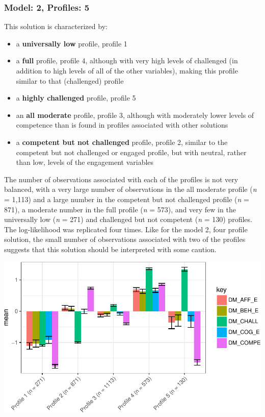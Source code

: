 \documentclass[]{msu-thesis}
\providecommand{\tightlist}{%
  \setlength{\itemsep}{0pt}\setlength{\parskip}{0pt}}
\theoremstyle{definition}
\theoremstyle{definition}
\theoremstyle{definition}
\theoremstyle{remark}
\begin{document}
\subsubsection{Model: 2, Profiles: 5}\label{model-2-profiles-5}

This solution is characterized by:

\begin{itemize}
\tightlist
\item
  a \textbf{universally low} profile, profile 1
\item
  a \textbf{full} profile, profile 4, although with very high levels of
  challenged (in addition to high levels of all of the other variables),
  making this profile similar to that (challenged) profile
\item
  a \textbf{highly challenged} profile, profile 5
\item
  an \textbf{all moderate} profile, profile 3, although with moderately
  lower levels of competence than is found in profiles associated with
  other solutions
\item
  a \textbf{competent but not challenged} profile, profile 2, similar to
  the competent but not challenged or engaged profile, but with neutral,
  rather than low, levels of the engagement variables
\end{itemize}

The number of observations associated with each of the profiles is not
very balanced, with a very large number of observations in the all
moderate profile (\emph{n} = 1,113) and a large number in the competent
but not challenged profile (\emph{n} = 871), a moderate number in the
full profile (\emph{n} = 573), and very few in the universally low
(\emph{n} = 271) and challenged but not competent (\emph{n} = 130)
profiles. The log-likelihood was replicated four times. Like for the
model 2, four profile solution, the small number of observations
associated with two of the profiles suggests that this solution should
be interpreted with some caution.

\begin{center}\includegraphics[width=0.8\linewidth]{rosenberg-dissertation_files/figure-latex/m2_5p-1} \end{center}
\end{document}
